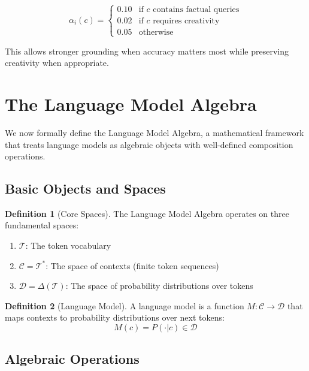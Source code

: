 \documentclass{article}
\theoremstyle{definition}
\newtheorem{definition}{Definition}
\begin{document}
\begin{equation}
\alpha_i(c) = \begin{cases}
0.10 & \text{if } c \text{ contains factual queries} \\
0.02 & \text{if } c \text{ requires creativity} \\
0.05 & \text{otherwise}
\end{cases}
\end{equation}

This allows stronger grounding when accuracy matters most while preserving creativity when appropriate.

\section{The Language Model Algebra}

We now formally define the Language Model Algebra, a mathematical framework that treats language models as algebraic objects with well-defined composition operations.

\subsection{Basic Objects and Spaces}

\begin{definition}[Core Spaces]
The Language Model Algebra operates on three fundamental spaces:
\begin{enumerate}
    \item $\mathcal{T}$: The token vocabulary
    \item $\mathcal{C} = \mathcal{T}^*$: The space of contexts (finite token sequences)
    \item $\mathcal{D} = \Delta(\mathcal{T})$: The space of probability distributions over tokens
\end{enumerate}
\end{definition}

\begin{definition}[Language Model]
A language model is a function $M: \mathcal{C} \rightarrow \mathcal{D}$ that maps contexts to probability distributions over next tokens:
\begin{equation}
M(c) = P(\cdot | c) \in \mathcal{D}
\end{equation}
\end{definition}

\subsection{Algebraic Operations}
\end{document}
